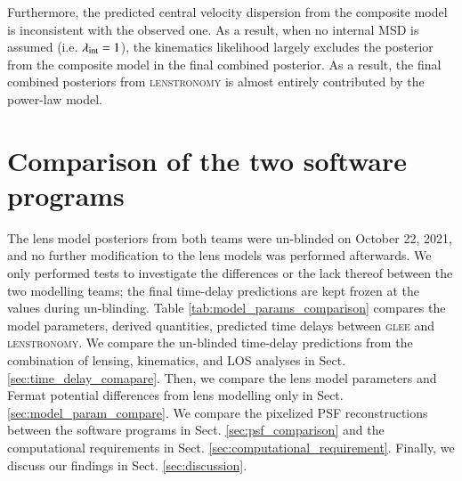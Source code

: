 \documentclass[longauth]{aa}
\newcommand{\ajs}[1]{{{#1}}}
\newcommand{\ajsii}[1]{{{#1}}}
\newcommand{\ajsiv}[1]{{{#1}}}
\newcommand{\suyu}[1]{{{#1}}}
\begin{document}
\ajsii{Furthermore, the predicted central velocity dispersion from the composite model is inconsistent with the observed one. As a result, when no internal MSD is assumed (i.e. $\lambda_{\rm int} = 1$), the kinematics likelihood largely excludes the posterior from the composite model in the final combined posterior. As a result, the final combined posteriors from \textsc{lenstronomy} is almost entirely contributed by the power-law model.
}



\section{Comparison of the two \ajs{software programs}} \label{sec:software_comparison}

The lens model posteriors from both teams were un-blinded on October 22, 2021, and no further modification to the lens models was performed afterwards. We only performed tests to investigate the differences or the lack thereof between the two modelling teams\suyu{;} %
the final time-delay predictions are kept frozen at the values during un-blinding. Table \ref{tab:model_params_comparison} compares the model parameters, derived quantities, \ajsiv{predicted time delays} between \textsc{glee} and \textsc{lenstronomy}. We compare the un-blinded time-delay predictions from the combination of lensing, kinematics, and LOS analyses in Sect. \ref{sec:time_delay_comapare}. Then, we compare the lens model parameters and  Fermat potential differences from lens modelling only in Sect. \ref{sec:model_param_compare}. We compare the pixelized PSF reconstructions between the software programs in Sect. \ref{sec:psf_comparison} and the computational requirements in Sect. \ref{sec:computational_requirement}. Finally, we discuss our findings in Sect. \ref{sec:discussion}.
\end{document}
